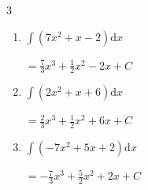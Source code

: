 \begin{multicols}{3}
\begin{enumerate}
        $\displaystyle =-\frac{2}{3}x^{3}-3x^{2}+3x+ C$

  \item $\displaystyle \int \left( 7x^{2}+x-2 \right) \mathrm{d}x$

        $\displaystyle =\frac{7}{3}x^{3}+\frac{1}{2}x^{2}-2x+ C$

  \item $\displaystyle \int \left( 2x^{2}+x+6 \right) \mathrm{d}x$

        $\displaystyle =\frac{2}{3}x^{3}+\frac{1}{2}x^{2}+6x+ C$

  \item $\displaystyle \int \left( -7x^{2}+5x+2 \right) \mathrm{d}x$

        $\displaystyle =-\frac{7}{3}x^{3}+\frac{5}{2}x^{2}+2x+ C$

\end{enumerate}
\end{multicols}
